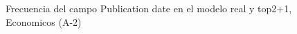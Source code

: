 \begin{figure}[H]
    \centering
    
    \caption{Frecuencia del campo Publication date en el modelo real y top2+1, Economicos (A-2)}
    \label{frecuency-Publication Date-top2+1}
\end{figure}